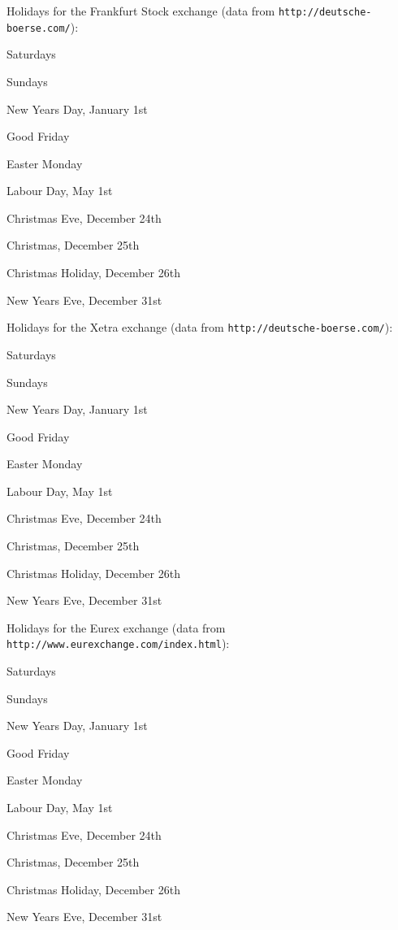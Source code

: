 Holidays for the Frankfurt Stock exchange (data from {\tt http\+://deutsche-\/boerse.\+com/})\+: 
\begin{DoxyItemize}
\item Saturdays 
\item Sundays 
\item New Year\textquotesingle{}s Day, January 1st 
\item Good Friday 
\item Easter Monday 
\item Labour Day, May 1st 
\item Christmas\textquotesingle{} Eve, December 24th 
\item Christmas, December 25th 
\item Christmas Holiday, December 26th 
\item New Year\textquotesingle{}s Eve, December 31st 
\end{DoxyItemize}

Holidays for the Xetra exchange (data from {\tt http\+://deutsche-\/boerse.\+com/})\+: 
\begin{DoxyItemize}
\item Saturdays 
\item Sundays 
\item New Year\textquotesingle{}s Day, January 1st 
\item Good Friday 
\item Easter Monday 
\item Labour Day, May 1st 
\item Christmas\textquotesingle{} Eve, December 24th 
\item Christmas, December 25th 
\item Christmas Holiday, December 26th 
\item New Year\textquotesingle{}s Eve, December 31st 
\end{DoxyItemize}

Holidays for the Eurex exchange (data from {\tt http\+://www.\+eurexchange.\+com/index.\+html})\+: 
\begin{DoxyItemize}
\item Saturdays 
\item Sundays 
\item New Year\textquotesingle{}s Day, January 1st 
\item Good Friday 
\item Easter Monday 
\item Labour Day, May 1st 
\item Christmas\textquotesingle{} Eve, December 24th 
\item Christmas, December 25th 
\item Christmas Holiday, December 26th 
\item New Year\textquotesingle{}s Eve, December 31st 
\end{DoxyItemize}

